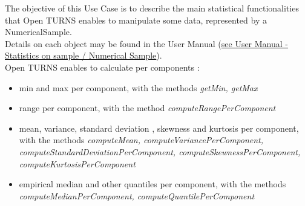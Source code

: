 \renewcommand{\filename}{docUC_InputWithData_StatisticalManipulation.tex}
\renewcommand{\filetitle}{UC :  Statistical manipulations on data : min, max, covariance, skewness, kurtosis, quantile, empirical CDF, Pearson, Kendall and Spearman correlation matrixes and rank/sort functionnalities}

\HeaderIIILevel

\label{statistical}





The objective of this Use Case is to describe the main statistical functionalities that Open TURNS enables to manipulate some data, represented by a NumericalSample.\\




Details on each object may be found in the User Manual  (\href{OpenTURNS_UserManual_TUI.pdf}{see User Manual - Statistics on sample / Numerical Sample}).\\




Open TURNS enables to calculate per components :
\begin{itemize}
\item min and max per component, with the methods {\itshape getMin, getMax}
\item range per component, with the method {\itshape computeRangePerComponent}
\item mean, variance, standard deviation , skewness and kurtosis  per component, with the methods {\itshape computeMean, computeVariancePerComponent, computeStandardDeviationPerComponent, computeSkewnessPerComponent, computeKurtosisPerComponent}
\item empirical median and other quantiles per component, with the methods {\itshape computeMedianPerComponent, computeQuantilePerComponent}
\end{itemize}

